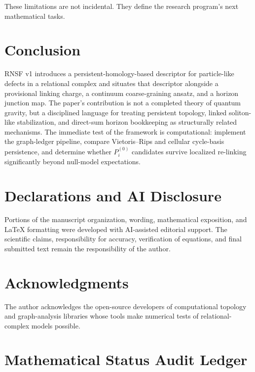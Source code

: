 \documentclass[11pt]{article}
\newcommand{\Pre}{P_i^{(0)}}
\begin{document}
These limitations are not incidental. They define the research program's next mathematical tasks.

\section{Conclusion}

RNSF v1 introduces a persistent-homology-based descriptor for particle-like defects in a relational complex and situates that descriptor alongside a provisional linking charge, a continuum coarse-graining ansatz, and a horizon junction map. The paper's contribution is not a completed theory of quantum gravity, but a disciplined language for treating persistent topology, linked soliton-like stabilization, and direct-sum horizon bookkeeping as structurally related mechanisms. The immediate test of the framework is computational: implement the graph-ledger pipeline, compare Vietoris--Rips and cellular cycle-basis persistence, and determine whether \(\Pre\) candidates survive localized re-linking significantly beyond null-model expectations.

\section*{Declarations and AI Disclosure}

Portions of the manuscript organization, wording, mathematical exposition, and \LaTeX{} formatting were developed with AI-assisted editorial support. The scientific claims, responsibility for accuracy, verification of equations, and final submitted text remain the responsibility of the author.

\section*{Acknowledgments}
The author acknowledges the open-source developers of computational topology and graph-analysis libraries whose tools make numerical tests of relational-complex models possible.

\appendix

\section{Mathematical Status Audit Ledger}
\label{app:audit}
\end{document}
